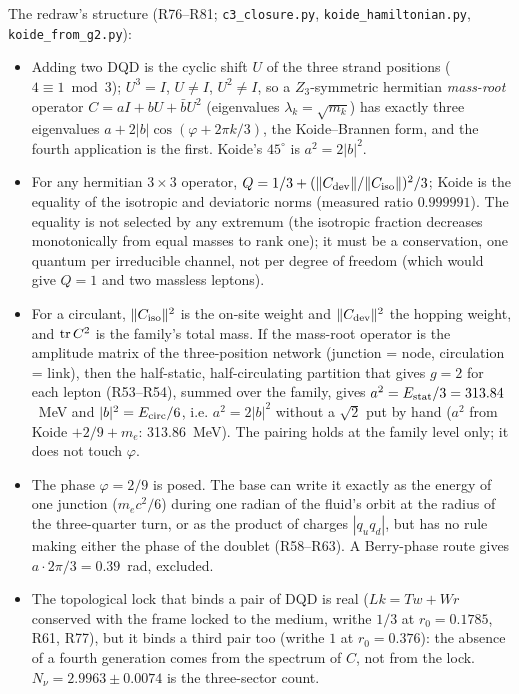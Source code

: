\documentclass[11pt,a4paper]{article}
\theoremstyle{plain}
\theoremstyle{remark}
\begin{document}
The redraw's structure (R76--R81; \texttt{c3\_closure.py}, \texttt{koide\_hamiltonian.py},
\texttt{koide\_from\_g2.py}):

\begin{itemize}[nosep]
\item Adding two DQD is the cyclic shift $U$ of the three strand positions ($4 \equiv 1 \bmod 3$);
$U^3 = I$, $U \ne I$, $U^2 \ne I$, so a $Z_3$-symmetric hermitian \emph{mass-root} operator
$C = aI + bU + \bar b U^2$ (eigenvalues $\lambda_k = \sqrt{m_k}$) has exactly three eigenvalues
$a + 2|b|\cos(\varphi + 2\pi k/3)$, the Koide--Brannen form, and the fourth application is the
first. Koide's $45^\circ$ is $a^2 = 2|b|^2$.
\item For any hermitian $3\times3$ operator, $Q = 1/3 + (\|C_{\rm dev}\|/\|C_{\rm iso}\|)^2/3$;
Koide is the equality of the isotropic and deviatoric norms (measured ratio $0.999991$). The
equality is not selected by any extremum (the isotropic fraction decreases monotonically from
equal masses to rank one); it must be a conservation, one quantum per irreducible channel, not per
degree of freedom (which would give $Q = 1$ and two massless leptons).
\item For a circulant, $\|C_{\rm iso}\|^2$ is the on-site weight and $\|C_{\rm dev}\|^2$ the
hopping weight, and ${\rm tr}\,C^2$ is the family's total mass. If the mass-root operator is the
amplitude matrix of the three-position network (junction = node, circulation = link), then the
half-static, half-circulating partition that gives $g = 2$ for each lepton (R53--R54), summed
over the family, gives $a^2 = E_{\rm stat}/3 = 313.84$~MeV and $|b|^2 = E_{\rm circ}/6$, i.e.
$a^2 = 2|b|^2$ without a $\sqrt2$ put by hand ($a^2$ from Koide $+2/9+m_e$: 313.86~MeV). The
pairing holds at the family level only; it does not touch $\varphi$.
\item The phase $\varphi = 2/9$ is posed. The base can write it exactly as the energy of one
junction ($m_e c^2/6$) during one radian of the fluid's orbit at the radius of the three-quarter
turn, or as the product of charges $|q_u q_d|$, but has no rule making either the phase of the
doublet (R58--R63). A Berry-phase route gives $a\cdot 2\pi/3 = 0.39$~rad, excluded.
\item The topological lock that binds a pair of DQD is real ($Lk = Tw + Wr$ conserved with the
frame locked to the medium, writhe $1/3$ at $r_0 = 0.1785$, R61, R77), but it binds a third pair
too (writhe $1$ at $r_0 = 0.376$): the absence of a fourth generation comes from the spectrum of
$C$, not from the lock. $N_\nu = 2.9963 \pm 0.0074$ \cite{pdg} is the three-sector count.
\end{itemize}
\end{document}
